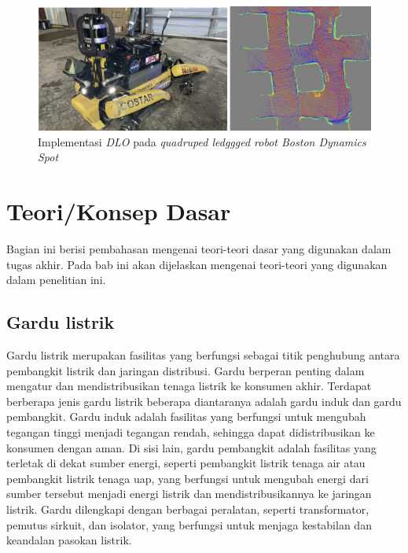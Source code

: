 \begin{figure} [H] \centering
  \includegraphics{gambar/dlo.png}
  \caption{Implementasi \emph{DLO} pada \emph{quadruped ledggged robot Boston Dynamics Spot}}
  \label{fig:Implementasi DLO pada quadruped legged robot Boston Dynamics Spot}
\end{figure}

\section{Teori/Konsep Dasar}
Bagian ini berisi pembahasan mengenai teori-teori dasar yang digunakan dalam tugas akhir. Pada bab ini akan dijelaskan mengenai teori-teori yang digunakan dalam penelitian ini. 

\subsection{Gardu listrik}
Gardu listrik merupakan fasilitas yang berfungsi sebagai titik penghubung antara pembangkit listrik dan jaringan distribusi. Gardu berperan penting dalam mengatur dan mendistribusikan tenaga listrik ke konsumen akhir. Terdapat berberapa jenis gardu listrik beberapa diantaranya adalah gardu induk dan gardu pembangkit. Gardu induk adalah fasilitas yang berfungsi untuk mengubah tegangan tinggi menjadi tegangan rendah, sehingga dapat didistribusikan ke konsumen dengan aman. Di sisi lain, gardu pembangkit adalah fasilitas yang terletak di dekat sumber energi, seperti pembangkit listrik tenaga air atau pembangkit listrik tenaga uap, yang berfungsi untuk mengubah energi dari sumber tersebut menjadi energi listrik dan mendistribusikannya ke jaringan listrik. Gardu dilengkapi dengan berbagai peralatan, seperti transformator, pemutus sirkuit, dan isolator, yang berfungsi untuk menjaga kestabilan dan keandalan pasokan listrik. 

